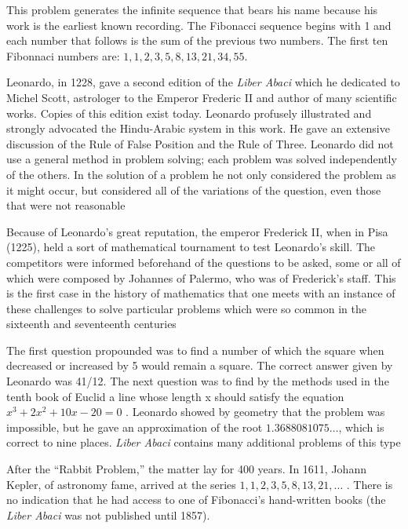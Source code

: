 \documentclass[10pt,]{book}
\theoremstyle{plain}
\theoremstyle{definition}
\begin{document}
\par
This problem generates the infinite sequence that bears his name because his work is the earliest known recording. The Fibonacci sequence begins with 1 and each number that follows is the sum of the previous two numbers. The first ten Fibonnaci numbers are: \(1, 1, 2, 3, 5, 8, 13, 21,
34, 55\).%
\par
Leonardo, in 1228, gave a second edition of the \emph{Liber Abaci} which he dedicated to Michel Scott, astrologer to the Emperor Frederic II and author of many scientific works. Copies of this edition exist today. Leonardo profusely illustrated and strongly advocated the Hindu-Arabic system in this work. He gave an extensive discussion of the Rule of False Position and the Rule of Three. Leonardo did not use a general method in problem solving; each problem was solved independently of the others. In the solution of a problem he not only considered the problem as it might occur, but considered all of the variations of the question, even those that were not reasonable%
\par
Because of Leonardo's great reputation, the emperor Frederick II, when in Pisa (1225), held a sort of mathematical tournament to test Leonardo's skill. The competitors were informed beforehand of the questions to be asked, some or all of which were composed by Johannes of Palermo, who was of Frederick's staff. This is the first case in the history of mathematics that one meets with an instance of these challenges to solve particular problems which were so common in the sixteenth and seventeenth centuries%
\par
The first question propounded was to find a number of which the square when decreased or increased by 5 would remain a square. The correct answer given by Leonardo was 41/12. The next question was to find by the methods used in the tenth book of Euclid a line whose length x should satisfy the equation \(x^3 + 2x^2 + 10x - 20 = 0\) . Leonardo showed by geometry that the problem was impossible, but he gave an approximation of the root \(1.3688081075\ldots\), which is correct to nine places. \emph{Liber Abaci} contains many additional problems of this type%
\par
After the ``Rabbit Problem,'' the matter lay for 400 years. In 1611, Johann Kepler, of astronomy fame, arrived at the series \(1, 1, 2, 3, 5,
8, 13, 21, \ldots\) . There is no indication that he had access to one of Fibonacci's hand-written books (the \emph{Liber Abaci} was not published until 1857).%
\par
\end{document}

